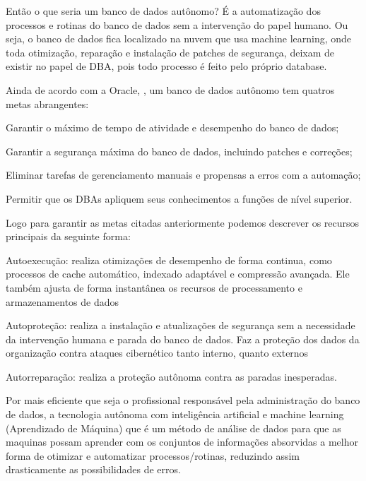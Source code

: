 Então o que seria um banco de dados autônomo? É a automatização dos processos e rotinas do banco de dados sem a intervenção do papel humano. Ou seja, o banco de dados fica localizado na nuvem que usa machine learning, onde toda otimização, reparação e instalação de patches de segurança, deixam de existir no papel de DBA, pois todo processo é feito pelo próprio database.


Ainda de acordo com a Oracle, \cite{OracleDataBase}, um banco de dados autônomo tem quatros metas abrangentes:
\begin{alineas}
\item Garantir o máximo de tempo de atividade e desempenho do banco de dados;
\item Garantir a segurança máxima do banco de dados, incluindo patches e correções;
\item Eliminar tarefas de gerenciamento manuais e propensas a erros com a automação;
\item Permitir que os DBAs apliquem seus conhecimentos a funções de nível superior.
\end{alineas}


Logo para garantir as metas citadas anteriormente podemos descrever os recursos principais da seguinte forma:

\begin{alineas}
\item Autoexecução: realiza otimizações de desempenho de forma continua, como processos de cache automático, indexado adaptável e compressão avançada. Ele também ajusta de forma instantânea os recursos de processamento e armazenamentos de dados
\item Autoproteção: realiza a instalação e atualizações de segurança sem a necessidade da intervenção humana e parada do banco de dados. Faz a proteção dos dados da organização contra ataques cibernético tanto interno, quanto externos
\item Autorreparação: realiza a proteção autônoma contra as paradas inesperadas.
\end{alineas}


Por mais eficiente que seja o profissional responsável pela administração do banco de dados, a tecnologia autônoma com inteligência artificial e machine learning (Aprendizado de Máquina) que é um método de análise de dados para que as maquinas possam aprender com os conjuntos de informações absorvidas a melhor forma de otimizar e automatizar processos/rotinas, reduzindo assim drasticamente as possibilidades de erros.


